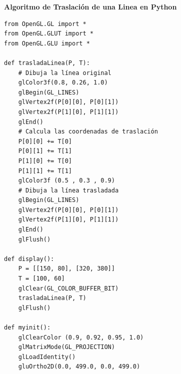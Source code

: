 \documentclass[a4paper]{article}
\begin{document}
\restoregeometry
\newpage

\Large{\textbf{Algoritmo de Traslación de una Linea en Python}}\\[-0.4cm]
\begin{center}
\begin{mycodebox}
\begin{lstlisting}
from OpenGL.GL import *
from OpenGL.GLUT import *
from OpenGL.GLU import *

def trasladaLinea(P, T):
    # Dibuja la línea original
    glColor3f(0.8, 0.26, 1.0)
    glBegin(GL_LINES)
    glVertex2f(P[0][0], P[0][1])
    glVertex2f(P[1][0], P[1][1])
    glEnd()
    # Calcula las coordenadas de traslación
    P[0][0] += T[0]
    P[0][1] += T[1]
    P[1][0] += T[0]
    P[1][1] += T[1]
    glColor3f (0.5 , 0.3 , 0.9)
    # Dibuja la línea trasladada
    glBegin(GL_LINES)
    glVertex2f(P[0][0], P[0][1])
    glVertex2f(P[1][0], P[1][1])
    glEnd()
    glFlush()

def display():
    P = [[150, 80], [320, 380]] 
    T = [100, 60]
    glClear(GL_COLOR_BUFFER_BIT) 
    trasladaLinea(P, T) 
    glFlush() 

def myinit():
    glClearColor (0.9, 0.92, 0.95, 1.0)
    glMatrixMode(GL_PROJECTION) 
    glLoadIdentity() 
    gluOrtho2D(0.0, 499.0, 0.0, 499.0)  
\end{lstlisting}
\end{mycodebox}
\end{center}
\end{document}
